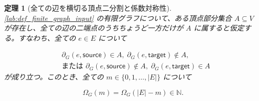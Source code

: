 \documentclass[11pt,a4paper]{article}
\newtheorem{theorem}[definition]{定理}
\theoremstyle{remark}
\begin{document}
\begin{theorem}[全ての辺を横切る頂点二分割と係数対称性]\label{lab:theorem_full_cut_coefficient_symmetry}
\cref{lab:def_finite_graph_input}
 の有限グラフについて、ある頂点部分集合 
$A\subseteq V$
 が存在し、全ての辺の二端点のうちちょうど一方だけが 
$A$
 に属すると仮定する。すなわち、全ての 
$e\in E$
 について

\[\begin{aligned}
&\partial_G(e,\mathsf{source})\in A,\;
\partial_G(e,\mathsf{target})\notin A,\\
&\text{または }\partial_G(e,\mathsf{source})\notin A,\;
\partial_G(e,\mathsf{target})\in A
\end{aligned}\]
が成り立つ。このとき、全ての 
$m\in\{0,1,\ldots,|E|\}$
 について

\[\Omega_G(m)=\Omega_G(|E|-m)\in\mathbb N.\]
\end{theorem}
\end{document}
